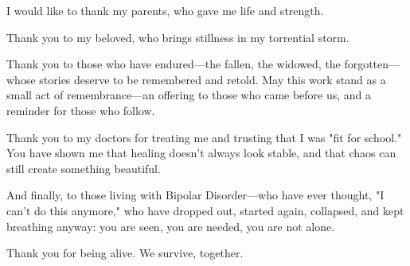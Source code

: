 \documentclass[../1_thesis]{subfiles}
\begin{document}

\begin{acknowledgementslong}
I would like to thank my parents, who gave me life and strength.

Thank you to my beloved, who brings stillness in my torrential storm.

Thank you to those who have endured—the fallen, the widowed, the forgotten---whose stories deserve to be remembered and retold.  
May this work stand as a small act of remembrance—an offering to those who came before us, and a reminder for those who follow.

Thank you to my doctors for treating me and trusting that I was "fit for school." 
You have shown me that healing doesn't always look stable, and that chaos can still create something beautiful.

And finally, to those living with Bipolar Disorder—who have ever thought, "I can't do this anymore," 
who have dropped out, started again, collapsed, and kept breathing anyway:  
you are seen, you are needed, you are not alone.  

Thank you for being alive.
We survive, together.

\end{acknowledgementslong}
\end{document}
